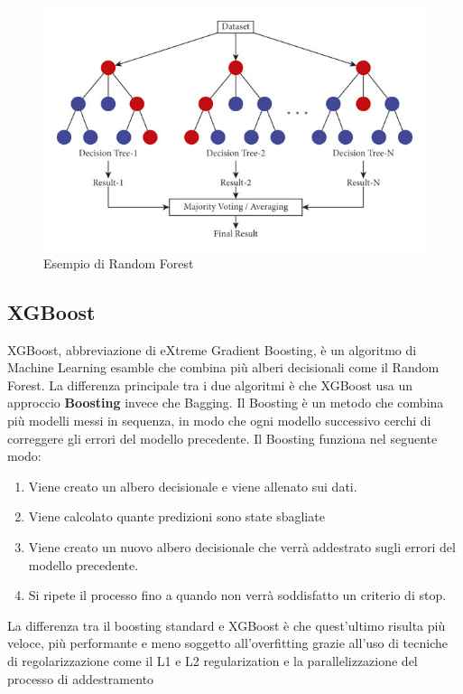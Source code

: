 \documentclass[12pt,a4paper,openright,twoside]{book}
\begin{document}
\begin{figure}
    \centering
    \includegraphics[width=.8\linewidth]{figures/Illustration-of-random-forest-trees.jpg}
    \caption{Esempio di Random Forest \cite{RFIMAGE}}
    \label{fig:random forest}
\end{figure}



\subsection{XGBoost}
XGBoost, abbreviazione di eXtreme Gradient Boosting, è un algoritmo di Machine Learning
esamble che combina più alberi decisionali come il Random Forest.
La differenza principale tra i due algoritmi è che XGBoost usa un approccio
\textbf{Boosting} invece che Bagging.
Il Boosting è un metodo che combina più modelli
messi in sequenza, in modo che ogni modello successivo
cerchi di correggere gli errori del modello precedente.
Il Boosting funziona nel seguente modo:
\begin{enumerate}
    \item Viene creato un albero decisionale e viene allenato sui dati.
    \item Viene calcolato quante predizioni sono state sbagliate
    \item Viene creato un nuovo albero decisionale che verrà addestrato sugli errori del modello precedente.
    \item Si ripete il processo fino a quando non verrà soddisfatto un criterio di stop.
\end{enumerate}

La differenza tra il boosting standard e XGBoost è che quest'ultimo
risulta più veloce, più performante e meno soggetto all'overfitting
grazie all'uso di tecniche di regolarizzazione come il L1 e L2 regularization
e la parallelizzazione del processo di addestramento \cite{Xgboost2016}
\end{document}
